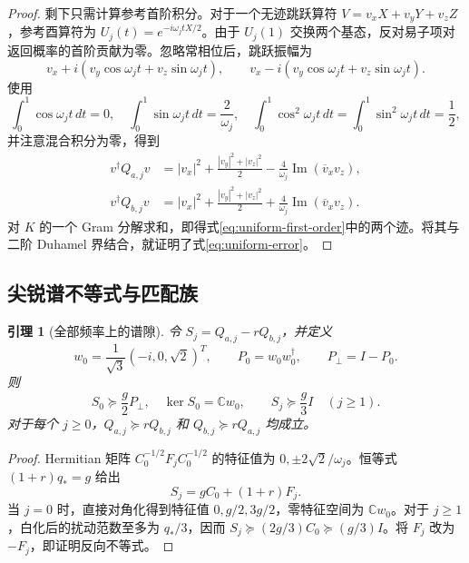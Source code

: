 \documentclass[UTF8,11pt,a4paper,fontset=fandol]{ctexart}
\newtheorem{lemma}[theorem]{引理}
\theoremstyle{definition}
\theoremstyle{remark}
\DeclareMathOperator{\Ima}{Im}
\newcommand{\C}{\mathbb C}
\begin{document}
\begin{proof}
剩下只需计算参考首阶积分。对于一个无迹跳跃算符 \(V=v_xX+v_yY+v_zZ\)，参考酉算符为 \(U_j(t)=e^{-i\omega_jtX/2}\)。由于 \(U_j(1)\) 交换两个基态，反对易子项对返回概率的首阶贡献为零。忽略常相位后，跳跃振幅为
\[
 v_x+i(v_y\cos\omega_jt+v_z\sin\omega_jt),\qquad
 v_x-i(v_y\cos\omega_jt+v_z\sin\omega_jt).
\]
使用
\[
 \int_0^1\cos\omega_jt\,dt=0,\quad
 \int_0^1\sin\omega_jt\,dt=\frac2{\omega_j},\quad
 \int_0^1\cos^2\omega_jt\,dt=\int_0^1\sin^2\omega_jt\,dt=\frac12,
\]
并注意混合积分为零，得到
\begin{equation}\label{eq:quadratic-forms}
 \begin{aligned}
 v^\dagger Q_{a,j}v&=|v_x|^2+\frac{|v_y|^2+|v_z|^2}{2}
 -\frac4{\omega_j}\Ima(\overline v_xv_z),\\
 v^\dagger Q_{b,j}v&=|v_x|^2+\frac{|v_y|^2+|v_z|^2}{2}
 +\frac4{\omega_j}\Ima(\overline v_xv_z).
 \end{aligned}
\end{equation}
对 \(K\) 的一个 Gram 分解求和，即得式\eqref{eq:uniform-first-order}中的两个迹。将其与二阶 Duhamel 界结合，就证明了式\eqref{eq:uniform-error}。
\end{proof}

\subsection{尖锐谱不等式与匹配族}
\begin{lemma}[全部频率上的谱隙]\label{lem:spectrum}
令 \(S_j=Q_{a,j}-rQ_{b,j}\)，并定义
\begin{equation}\label{eq:kernel}
 w_0=\frac1{\sqrt3}(-i,0,\sqrt2)^T,\qquad
 P_0=w_0w_0^\dagger,\qquad P_\perp=I-P_0.
\end{equation}
则
\begin{equation}\label{eq:spectral-gap}
 S_0\succeq\frac g2P_\perp,\quad \ker S_0=\C w_0,
 \qquad S_j\succeq\frac g3I\quad(j\geq1).
\end{equation}
对于每个 \(j\geq0\)，\(Q_{a,j}\succeq rQ_{b,j}\) 和 \(Q_{b,j}\succeq rQ_{a,j}\) 均成立。
\end{lemma}
\begin{proof}
Hermitian 矩阵 \(C_0^{-1/2}F_jC_0^{-1/2}\) 的特征值为
\(0,\pm2\sqrt2/\omega_j\)。恒等式 \((1+r)q_*=g\) 给出
\[
 S_j=gC_0+(1+r)F_j.
\]
当 \(j=0\) 时，直接对角化得到特征值 \(0,g/2,3g/2\)，零特征空间为 \(\C w_0\)。对于 \(j\geq1\)，白化后的扰动范数至多为 \(q_*/3\)，因而 \(S_j\succeq(2g/3)C_0\succeq(g/3)I\)。将 \(F_j\) 改为 \(-F_j\)，即证明反向不等式。
\end{proof}
\end{document}
